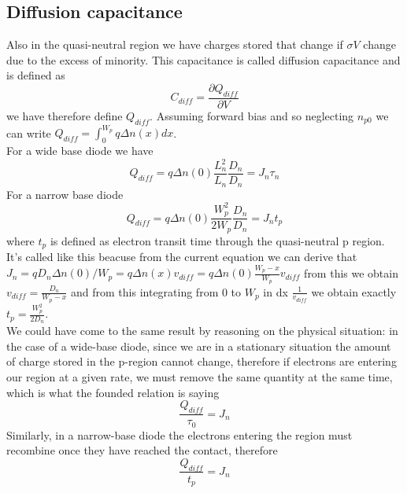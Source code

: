 \subsection{Diffusion capacitance}
Also in the quasi-neutral region we have charges stored that change if $\sigma V$ change due to the excess of minority. This capacitance is called diffusion capacitance and is defined as 
\begin{equation}
C_{diff}=\frac{\partial Q_{diff}}{\partial V}
\end{equation} 
we have therefore define $Q_{diff}$. Assuming forward bias and so neglecting $n_{p0}$ we can write $Q_{diff}=\int^{W_p}_0 q\Delta n(x) dx$.\\
For a wide base diode we have 
\begin{equation}
Q_{diff}=q\Delta n(0) \frac{L_n^2}{L_n}\frac{D_n}{D_n}=J_n\tau_n
\end{equation}
For a narrow base diode 
\begin{equation}
Q_{diff}=q\Delta n(0) \frac{W_p^2}{2W_p}\frac{D_n}{D_n}=J_nt_p
\end{equation}
where $t_p$ is defined as electron transit time through the quasi-neutral p region.\\

It's called like this beacuse from the current equation we can derive that $J_n=qD_n\Delta n(0)/W_p=q\Delta n(x) v_{diff}=q\Delta n(0)\frac{W_p-x}{W_p} v_{diff}$ from this we obtain $v_{diff}=\frac{D_n}{W_p-x}$ and from this integrating from 0 to $W_p$ in dx $\frac{1}{v_{diff}}$ we obtain exactly $t_p=\frac{W_p^2}{2D_n}$.\\
\vspace{5mm}
We could have come to the same result by reasoning on the physical situation: in the case of a wide-base diode, since we are in a stationary situation the amount of charge stored in the p-region cannot change, therefore if electrons are entering our region at a given rate, we must remove the same quantity at the same time, which is what the founded relation is saying
\begin{equation}
\frac{Q_{diff}}{\tau_0}=J_n
\end{equation}
Similarly, in a narrow-base diode the electrons entering the region must
recombine once they have reached the contact, therefore
\begin{equation}
\frac{Q_{diff}}{t_p}=J_n
\end{equation}
\vspace{5mm}\\

